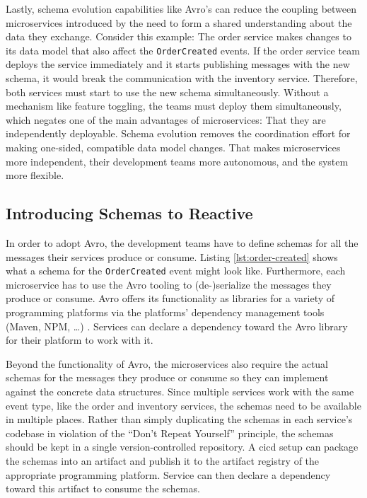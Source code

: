 Lastly, schema evolution capabilities like Avro's can reduce the coupling between microservices introduced by the need to form a shared understanding about the data they exchange.
Consider this example: The order service makes changes to its data model that also affect the \texttt{OrderCreated} events.
If the order service team deploys the service immediately and it starts publishing messages with the new schema, it would break the communication with the inventory service.
Therefore, both services must start to use the new schema simultaneously.
Without a mechanism like feature toggling, the teams must deploy them simultaneously, which negates one of the main advantages of microservices: That they are independently deployable.
Schema evolution removes the coordination effort for making one-sided, compatible data model changes.
That makes microservices more independent, their development teams more autonomous, and the system more flexible.

\subsection{Introducing Schemas to Reactive }\label{sec:introducing-schemas}

In order to adopt Avro, the development teams have to define schemas for all the messages their services produce or consume.
Listing \ref{lst:order-created} shows what a schema for the \texttt{OrderCreated} event might look like.
Furthermore, each microservice has to use the Avro tooling to (de-)serialize the messages they produce or consume.
Avro offers its functionality as libraries for a variety of programming platforms via the platforms' dependency management tools (Maven, NPM, \ldots) \parencite{avro}.
Services can declare a dependency toward the Avro library for their platform to work with it.

Beyond the functionality of Avro, the microservices also require the actual schemas for the messages they produce or consume so they can implement against the concrete data structures.
Since multiple services work with the same event type, like the order and inventory services, the schemas need to be available in multiple places.
Rather than simply duplicating the schemas in each service's codebase in violation of the \enquote{Don't Repeat Yourself} principle, the schemas should be kept in a single version-controlled repository.
A \gls{cicd} setup can package the schemas into an artifact and publish it to the artifact registry of the appropriate programming platform.
Service can then declare a dependency toward this artifact to consume the schemas.

